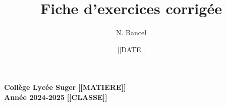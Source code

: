 \documentclass[answers]{exam}
\title{Fiche d'exercices corrigée}
\author{N. Bancel}
\date{[[DATE]]}
\begin{document}
\textbf{Collège Lycée Suger}
\hfill
\textbf{[[MATIERE]]} \\

\textbf{Année 2024-2025}
\hfill
\textbf{[[CLASSE]]} \par

{\let\newpage\relax\maketitle}
\end{document}

